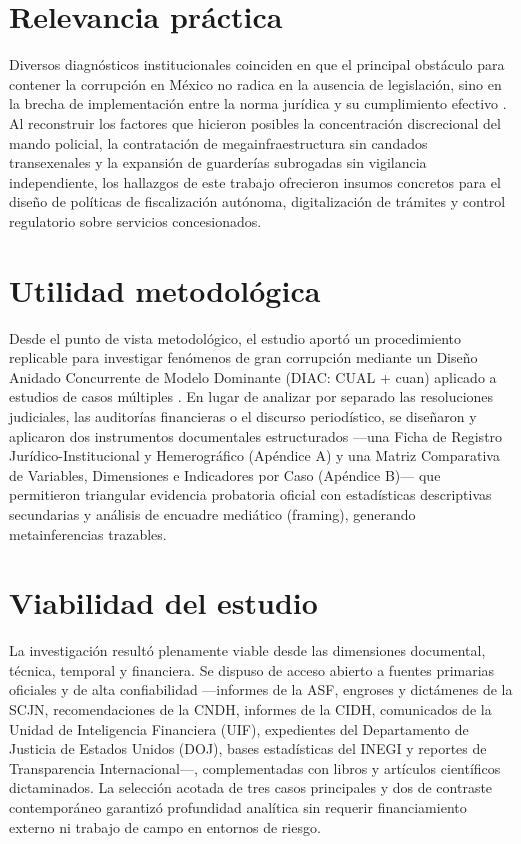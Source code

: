 \section{Relevancia práctica}

Diversos diagnósticos institucionales coinciden en que el principal obstáculo para contener la corrupción en México no radica en la ausencia de legislación, sino en la brecha de implementación entre la norma jurídica y su cumplimiento efectivo \citep{casar2024,lopezayllon2009,peschard2017}. Al reconstruir los factores que hicieron posibles la concentración discrecional del mando policial, la contratación de megainfraestructura sin candados transexenales y la expansión de guarderías subrogadas sin vigilancia independiente, los hallazgos de este trabajo ofrecieron insumos concretos para el diseño de políticas de fiscalización autónoma, digitalización de trámites y control regulatorio sobre servicios concesionados.

\section{Utilidad metodológica}

Desde el punto de vista metodológico, el estudio aportó un procedimiento replicable para investigar fenómenos de gran corrupción mediante un Diseño Anidado Concurrente de Modelo Dominante (DIAC: CUAL + cuan) aplicado a estudios de casos múltiples \citep{hernandez2014}. En lugar de analizar por separado las resoluciones judiciales, las auditorías financieras o el discurso periodístico, se diseñaron y aplicaron dos instrumentos documentales estructurados ---una Ficha de Registro Jurídico-Institucional y Hemerográfico (Apéndice A) y una Matriz Comparativa de Variables, Dimensiones e Indicadores por Caso (Apéndice B)--- que permitieron triangular evidencia probatoria oficial con estadísticas descriptivas secundarias y análisis de encuadre mediático (framing), generando metainferencias trazables.

\section{Viabilidad del estudio}

La investigación resultó plenamente viable desde las dimensiones documental, técnica, temporal y financiera. Se dispuso de acceso abierto a fuentes primarias oficiales y de alta confiabilidad ---informes de la ASF, engroses y dictámenes de la SCJN, recomendaciones de la CNDH, informes de la CIDH, comunicados de la Unidad de Inteligencia Financiera (UIF), expedientes del Departamento de Justicia de Estados Unidos (DOJ), bases estadísticas del INEGI y reportes de Transparencia Internacional---, complementadas con libros y artículos científicos dictaminados. La selección acotada de tres casos principales y dos de contraste contemporáneo garantizó profundidad analítica sin requerir financiamiento externo ni trabajo de campo en entornos de riesgo.